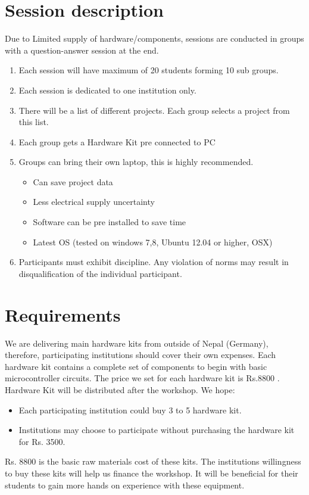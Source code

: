 \documentclass[12pt]{article} %
\begin{document}
\section{Session description} %
Due to Limited supply of hardware/components, sessions are conducted in groups with a question-answer session at the end.
\begin{enumerate}
\item Each session will have maximum of 20 students forming 10 sub groups.
\item Each session is dedicated to one institution only.
\item There will be a list of different projects. Each group selects a project from this list.  
\item Each group gets a Hardware Kit pre connected to PC 
\item Groups can bring their own laptop, this is highly recommended. 
	\begin{itemize}
	\item Can save project data
	\item Less electrical supply uncertainty
	\item Software can be pre installed to save time
	\item Latest OS (tested on windows 7,8, Ubuntu 12.04 or higher, OSX)
	\end{itemize}
\item Participants must exhibit discipline. Any violation of norms may result in disqualification of the individual participant.
\end{enumerate}

\section{Requirements} %
We are delivering main hardware kits from outside of Nepal (Germany), therefore, participating institutions should cover their own expenses. Each hardware kit contains a complete set of components to begin with basic microcontroller circuits. The price we set for each hardware kit is Rs.8800 . Hardware Kit will be distributed after the workshop. We hope:
\begin{itemize}

\item Each participating institution could buy 3 to 5 hardware kit.
\item Institutions may choose to participate without purchasing the hardware kit for Rs. 3500.
\end{itemize}
Rs. 8800 is the basic raw materials cost of these kits. The institutions willingness to buy these kits will help us finance the workshop. It will be beneficial for their students to gain more hands on experience with these equipment.
\end{document}
